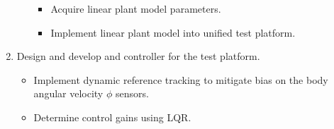\documentclass[crop=false,float=true,class=scrreprt]{standalone}
\begin{document}
\begin{enumerate}[leftmargin=*]
\begin{itemize}[leftmargin=*]
\begin{itemize}[leftmargin=*, label=$\vcenter{\hbox{\tiny$\bullet$}}$]
    \item Acquire linear plant model parameters.
    
    \item Implement linear plant model into unified test platform.
    
  \end{itemize}
  
\end{itemize}
  
\item Design and develop and controller for the test platform.
\begin{itemize}[leftmargin=*, label=$\cdot$]

  \item Implement dynamic reference tracking to mitigate bias on the body angular velocity $\phi$ sensors.
  
  \item Determine control gains using LQR.
  
\end{itemize}

\end{enumerate}




\clearpage




\printbibliography[segment=\therefsegment, heading=subbibnumbered, title={Bibliography}]




\clearpage
\end{document}
